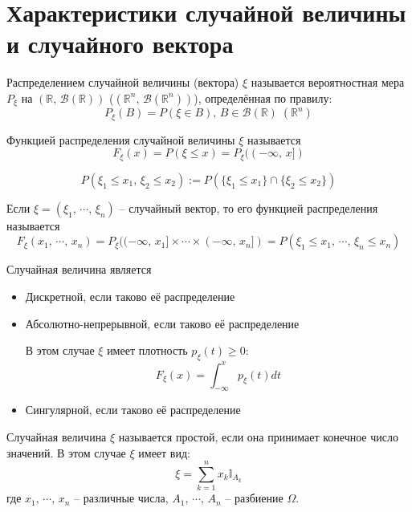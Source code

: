 \section{Характеристики случайной величины и случайного вектора}
\begin{definition}
	Распределением случайной величины (вектора) $\xi$ называется вероятностная мера $P_\xi$ на $(\mathbb{R},\,\mathcal{B}(\mathbb{R}))$ ($(\mathbb{R}^n,\,\mathcal{B}(\mathbb{R}^n))$), определённая по правилу:
	\[P_\xi(B) = P(\xi \in B),\, B \in \mathcal{B}(\mathbb{R}) \; (\mathbb{R}^n)\]
\end{definition}

\begin{definition}
	Функцией распределения случайной величины $\xi$ называется
	\[F_\xi(x) = P(\xi \leq x) = P_\xi((-\infty,\, x])\]
\end{definition}

\begin{note}
	\[P(\xi_1 \leq x_1,\, \xi_2 \leq x_2) := P(\{\xi_1 \leq x_1\} \cap \{\xi_2 \leq x_2\})\]
\end{note}

\begin{definition}
	Если $\xi = (\xi_1,\,\cdots,\,\xi_n)$ -- случайный вектор, то его функцией распределения называется
	\[F_\xi(x_1,\,\cdots,\,x_n) = P_\xi((-\infty,\,x_1]\times\cdots\times (-\infty,\,x_n]) = P(\xi_1 \leq x_1,\, \cdots,\, \xi_n \leq x_n)\]
\end{definition}

\begin{definition}
	Случайная величина является
	\begin{itemize}
		\item Дискретной, если таково её распределение
		\item Абсолютно-непрерывной, если таково её распределение

		      В этом случае $\xi$ имеет плотность $p_\xi(t) \geq 0$:
		      \[F_\xi(x) = \int_{-\infty}^x p_\xi(t)dt\]
		\item Сингулярной, если таково её распределение
	\end{itemize}
\end{definition}

\begin{definition}
	Случайная величина $\xi$ называется простой, если она принимает конечное число значений. В этом случае $\xi$ имеет вид:
	\[\xi = \sum_{k = 1}^n x_k \mathbb{I}_{A_k}\]
	где $x_1,\,\cdots,\,x_n$ -- различные числа, $A_1,\,\cdots,\,A_n$ -- разбиение $\Omega$.
\end{definition}

